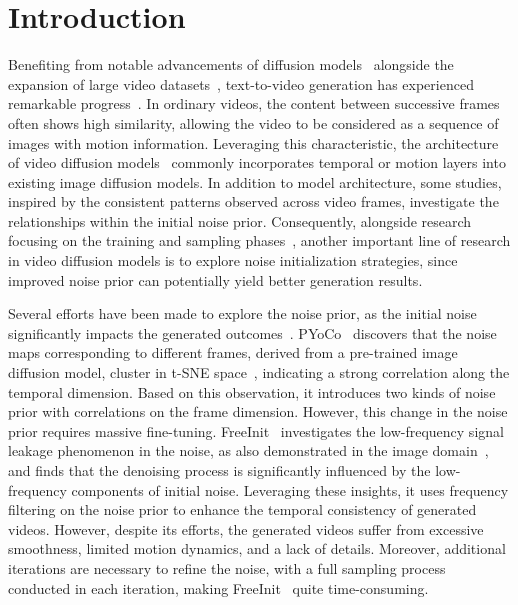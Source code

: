 \section{Introduction}
\label{sec:intro}
Benefiting from notable advancements of diffusion models~\citep{jascha2015nonequilibrium,ho2020denoising,song2021scorebased} alongside the expansion of large video datasets~\citep{bain2021frozen, Schuhmann2022laion5b}, text-to-video generation has experienced remarkable progress~\citep{ho2022imagenvideo,chenfei2022nuwa,Blattmann2023align,ge2023PYoCo,guo2023animatediff,uriel2023make-a-video,wang2023modelscope,chen2023videocrafter1}.
In ordinary videos, the content between successive frames often shows high similarity, allowing the video to be considered as a sequence of images with motion information.
Leveraging this characteristic, the architecture of video diffusion models~\citep{Blattmann2023align, wang2023modelscope, wenyi2023cogvideo, guo2023animatediff} commonly incorporates temporal or motion layers into existing image diffusion models.
In addition to model architecture, some studies, inspired by the consistent patterns observed across video frames, investigate the relationships within the initial noise prior.
Consequently, alongside research focusing on the training and sampling phases~\citep{song2021ddim, karras2022edm,lu2022dpmsolver, salimans2022progressive, song2023consistency}, another important line of research in video diffusion models is to explore noise initialization strategies, since improved noise prior can potentially yield better generation results.

Several efforts have been made to explore the noise prior, as the initial noise significantly impacts the generated outcomes~\citep{ge2023PYoCo,qiu2023freenoise,chang2024warp,gu2023reuse,mao2024lottery,wu2023freeinit}.
PYoCo~\citep{ge2023PYoCo} discovers that the noise maps corresponding to different frames, derived from a pre-trained image diffusion model, cluster in t-SNE space~\citep{van2008tsne}, indicating a strong correlation along the temporal dimension.
Based on this observation, it introduces two kinds of noise prior with correlations on the frame dimension. 
However, this change in the noise prior requires massive fine-tuning.
FreeInit~\citep{wu2023freeinit} investigates the low-frequency signal leakage phenomenon in the noise, as also demonstrated in the image domain~\citep{lin2024flaw}, and finds that the denoising process is significantly influenced by the low-frequency components of initial noise.
Leveraging these insights, it uses frequency filtering on the noise prior to enhance the temporal consistency of generated videos. 
However, despite its efforts, the generated videos suffer from excessive smoothness, limited motion dynamics, and a lack of details. 
Moreover, additional iterations are necessary to refine the noise, with a full sampling process conducted in each iteration, making FreeInit~\citep{wu2023freeinit} quite time-consuming.


